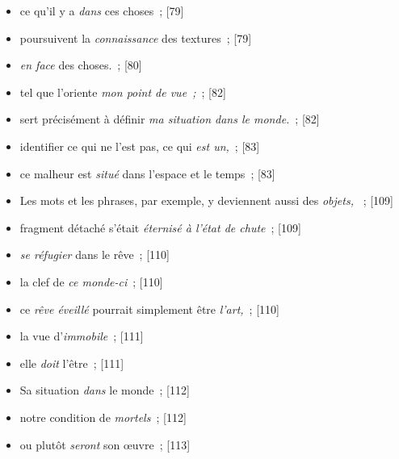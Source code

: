 \documentclass[12pt, a4paper]{article}
\begin{document}
\begin{itemize}
    \item ce qu’il y a \textit{dans} ces choses{\color{gray}~; [79]}

    \item  poursuivent la \textit{connaissance} des textures{\color{gray}~; [79]}

    \item \textit{en face} des choses.{\color{gray}~; [80]}

    \item tel que l’oriente \textit{mon point de vue~;}{\color{gray}~; [82]}

    \item sert précisément à définir \textit{ma situation dans le monde.}{\color{gray}~; [82]}

    \item identifier ce qui ne l’est pas, ce qui \textit{est un,}{\color{gray}~; [83]}

    \item ce malheur est \textit{situé} dans l’espace et le temps{\color{gray}~; [83]}

    \item Les mots et les phrases, par exemple, y deviennent aussi des \textit{objets, }{\color{gray}~; [109]}

    \item fragment détaché s’était \textit{éternisé à l’état de chute}{\color{gray}~; [109]}

    \item \textit{se réfugier} dans le rêve{\color{gray}~; [110]}

    \item la clef de \textit{ce monde-ci}{\color{gray}~; [110]}

    \item ce \textit{rêve éveillé} pourrait simplement être \textit{l’art,}{\color{gray}~; [110]}

    \item la vue d’\textit{immobile}{\color{gray}~; [111]}

    \item elle \textit{doit} l’être{\color{gray}~; [111]}

    \item Sa situation \textit{dans} le monde{\color{gray}~; [112]}

    \item notre condition de \textit{mortels}{\color{gray}~; [112]}

    \item ou plutôt \textit{seront} son œuvre{\color{gray}~; [113]}


\end{itemize}
\end{document}
